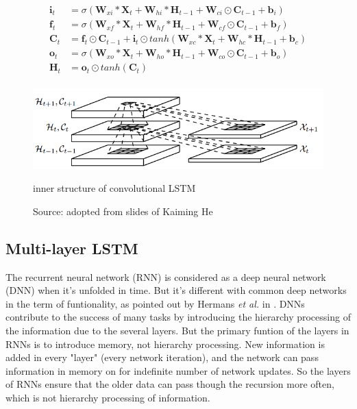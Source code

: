 \documentclass[twoside,a4paper,article]{combine}
\begin{document}
\begin{align*}
    \mathbf{i}_t &= \sigma(\mathbf{W}_{xi} \ast \mathbf{X}_t + 
                        \mathbf{W}_{hi} \ast \mathbf{H}_{t-1} + \mathbf{W}_{ci} \odot \mathbf{C}_{t-1}+ \mathbf{b}_i) \\
    \mathbf{f}_t &= \sigma(\mathbf{W}_{xf} \ast \mathbf{X}_t + 
                        \mathbf{W}_{hf} \ast \mathbf{H}_{t-1} + \mathbf{W}_{cf} \odot \mathbf{C}_{t-1}+ \mathbf{b}_f) \\
    \mathbf{C}_t &= \mathbf{f}_t \odot \mathbf{C}_{t-1} + \mathbf{i}_t \odot tanh(\mathbf{W}_{xc} \ast \mathbf{X}_t +
                        \mathbf{W}_{hc} \ast \mathbf{H}_{t-1} + \mathbf{b}_c) \\
    \mathbf{o}_t &= \sigma(\mathbf{W}_{xo}\ast\mathbf{X}_t + 
                        \mathbf{W}_{ho}\ast\mathbf{H}_{t-1} + \mathbf{W}_{co}\odot\mathbf{C}_{t-1}+ \mathbf{b}_o) \\
    \mathbf{H}_t &= \mathbf{o}_t \odot tanh(\mathbf{C}_t) \\
\end{align*}


\begin{figure}[ht!]
    \includegraphics[width=\linewidth]{convlstm}
    \caption{inner structure of convolutional LSTM}
    \caption*{Source: adopted from slides of Kaiming He}
    \label{fig:convlstm}
\end{figure}

\subsection{Multi-layer LSTM}
The recurrent neural network (RNN) is considered as a deep neural network (DNN) when it's unfolded in time. But it's different with common
deep networks in the term of funtionality, as pointed out by Hermans \emph{et al.} in \cite{deeprnn}.
DNNs contribute to the success of many tasks by introducing the hierarchy processing of the
information due to the several layers. But the primary funtion of the layers in RNNs is to introduce memory, not hierarchy processing. New
information is added in every "layer" (every network iteration), and the network can pass information in memory on for indefinite number 
of network updates. So the layers of RNNs ensure that the older data can pass though the recursion more often, which is not hierarchy 
processing of information.
\end{document}
